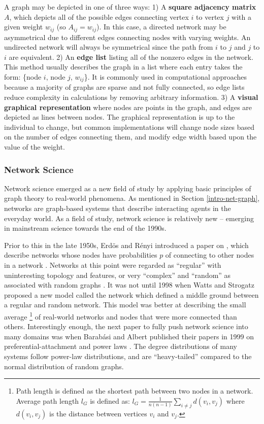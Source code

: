 A graph may be depicted in one of three ways: 1) A \textbf{square adjacency matrix} $A$, which depicts all of the possible edges connecting vertex $i$ to vertex $j$ with a given weight $w_{ij}$ (so $A_{ij} = w_{ij}$). In this case, a directed network may be asymmetrical due to different edges connecting nodes with varying weights. An undirected network will always be symmetrical since the path from $i$ to $j$ and $j$ to $i$ are equivalent. 2) An \textbf{edge list} listing all of the nonzero edges in the network. This method usually describes the graph in a list where each entry takes the form: \{node $i$, node $j$, $w_{ij}$\}. It is commonly used in computational approaches because a majority of graphs are sparse and not fully connected, so edge lists reduce complexity in calculations by removing arbitrary information. 3) A \textbf{visual graphical representation} where nodes are points in the graph, and edges are depicted as lines between nodes. The graphical representation is up to the individual to change, but common implementations will change node sizes based on the number of edges connecting them, and modify edge width based upon the value of the weight.

\subsubsection{Network Science}
Network science emerged as a new field of study by applying basic principles of graph theory to real-world phenomena. As mentioned in Section \ref{intro-net-graph}, networks are graph-based systems that describe interacting agents in the everyday world. As a field of study, network science is relatively new -- emerging in mainstream science towards the end of the 1990s. 

Prior to this in the late 1950s,  Erd\"{o}s and  R\'{e}nyi introduced a paper on , which describe networks whose nodes have probabilities $p$ of connecting to other nodes in a network \citep{Erdoes1959}. Networks at this point were regarded as ``regular'' with uninteresting topology and features, or very ``complex'' and ``random'' as associated with random graphs \citep{Vespignani2018}. It was not until 1998 when Watts and Strogatz proposed a new model called the  network \citep{Watts1998} which defined a middle ground between a regular and random network. This model was better at describing the small average \footnote{ Path length is defined as the shortest path between two nodes in a network. Average path length $l_G$ is defined as: $l_G=\frac{1}{n (n-1)}\sum_{i\neq j} d(v_i,v_j)$ where $d(v_i,v_j)$ is the distance between vertices $v_i$ and $v_j$.} 
of real-world networks and nodes that were more connected than others. Interestingly enough, the next paper to fully push network science into many domains was when Barab\'{a}si and Albert published their papers in 1999 on preferential-attachment and power laws \citep{Barabasi1999_emergence,Barabasi1999_mean_field,Albert1999}. The degree distributions of many systems follow power-law distributions, and are ``heavy-tailed'' compared to the normal distribution of random graphs. 

